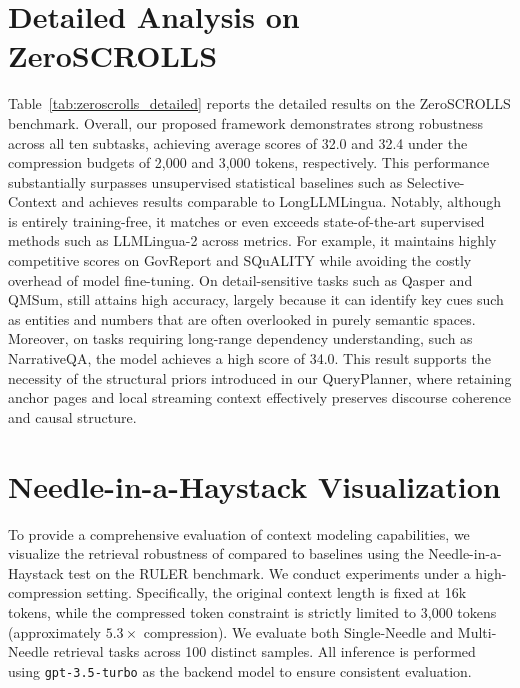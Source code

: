 \documentclass[11pt]{article}
\newcommand{\ours}{\text{BEAVER}\xspace}
\begin{document}
\section{Detailed Analysis on ZeroSCROLLS}
\label{appendix:details_zero}

Table~\ref{tab:zeroscrolls_detailed} reports the detailed results on the ZeroSCROLLS benchmark. Overall, our proposed \ours framework demonstrates strong robustness across all ten subtasks, achieving average scores of 32.0 and 32.4 under the compression budgets of 2,000 and 3,000 tokens, respectively. This performance substantially surpasses unsupervised statistical baselines such as Selective-Context and achieves results comparable to LongLLMLingua. Notably, although \ours is entirely training-free, it matches or even exceeds state-of-the-art supervised methods such as LLMLingua-2 across metrics. For example, it maintains highly competitive scores on GovReport and SQuALITY while avoiding the costly overhead of model fine-tuning. On detail-sensitive tasks such as Qasper and QMSum, \ours still attains high accuracy, largely because it can identify key cues such as entities and numbers that are often overlooked in purely semantic spaces. Moreover, on tasks requiring long-range dependency understanding, such as NarrativeQA, the model achieves a high score of 34.0. This result supports the necessity of the structural priors introduced in our QueryPlanner, where retaining anchor pages and local streaming context effectively preserves discourse coherence and causal structure.

\section{Needle-in-a-Haystack Visualization}
\label{appendix:needle}

To provide a comprehensive evaluation of context modeling capabilities, we visualize the retrieval robustness of \ours compared to baselines using the Needle-in-a-Haystack test on the RULER benchmark. We conduct experiments under a high-compression setting. Specifically, the original context length is fixed at 16k tokens, while the compressed token constraint is strictly limited to 3,000 tokens (approximately $5.3\times$ compression). We evaluate both Single-Needle and Multi-Needle retrieval tasks across 100 distinct samples. All inference is performed using \texttt{gpt-3.5-turbo} as the backend model to ensure consistent evaluation.
\end{document}
